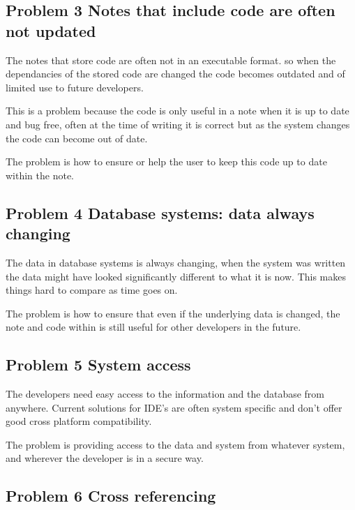 \subsection{Problem 3 Notes that include code are often not
updated}\label{problem-3-notes-that-include-code-are-often-not-updated}

The notes that store code are often not in an executable format. so when
the dependancies of the stored code are changed the code becomes
outdated and of limited use to future developers.

This is a problem because the code is only useful in a note when it is
up to date and bug free, often at the time of writing it is correct but
as the system changes the code can become out of date.

The problem is how to ensure or help the user to keep this code up to
date within the note.

\subsection{Problem 4 Database systems: data always
changing}\label{problem-4-database-systems-data-always-changing}

The data in database systems is always changing, when the system was
written the data might have looked significantly different to what it is
now. This makes things hard to compare as time goes on.

The problem is how to ensure that even if the underlying data is
changed, the note and code within is still useful for other developers
in the future.

\subsection{Problem 5 System access}\label{problem-5-system-access}

The developers need easy access to the information and the database from
anywhere. Current solutions for IDE's are often system specific and
don't offer good cross platform compatibility.

The problem is providing access to the data and system from whatever
system, and wherever the developer is in a secure way.

\subsection{Problem 6 Cross
referencing}\label{problem-6-cross-referencing}


